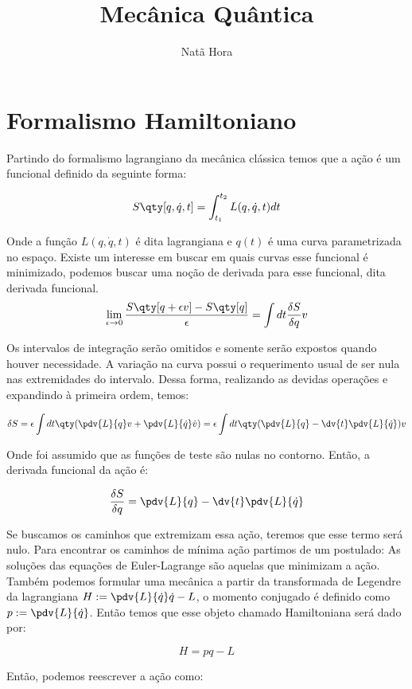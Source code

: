 \documentclass{article}
\title{Mecânica Quântica}
\author{Natã Hora}
\date{}
\begin{document}
	
	\maketitle
	
	\section{Formalismo Hamiltoniano}
	
	Partindo do formalismo lagrangiano da mecânica clássica temos que a ação é um funcional definido da seguinte forma:
	
	$$ S\qty[q,\dot{q},t]= \int_{t_1}^{t_2}L(q,\dot{q},t) dt$$
	
	Onde a função $L(q,\dot{q},t)$ é dita lagrangiana e $q(t)$ é uma curva parametrizada no espaço. Existe um interesse em buscar em quais curvas esse funcional é minimizado, podemos buscar uma noção de derivada para esse funcional, dita derivada funcional.
	$$ \lim_{\epsilon \to 0}\frac{S\qty[q+\epsilon v]-S\qty[q]}{\epsilon}= \int dt \frac{\delta S}{\delta q} v$$
	
	Os intervalos de integração serão omitidos e somente serão expostos quando houver necessidade. A variação na curva possui o requerimento usual de ser nula nas extremidades do intervalo. Dessa forma, realizando as devidas operações e expandindo à primeira ordem, temos:
	
	\begin{equation*}
		\delta S = \epsilon \int dt \qty(\pdv{L}{q}v + \pdv{L}{\dot{q}}\dot{v}) = \epsilon \int dt \qty(\pdv{L}{q}- \dv{t}\pdv{L}{\dot{q}})v
	\end{equation*}
	
	Onde foi assumido que as funções de teste são nulas no contorno. Então, a derivada funcional da ação é:
	
	$$\frac{\delta S}{\delta q}=\pdv{L}{q}- \dv{t}\pdv{L}{\dot{q}}$$
	
	\newpage
	Se buscamos os caminhos que extremizam essa ação, teremos que esse termo será nulo. Para encontrar os caminhos de mínima ação partimos de um postulado: As soluções das equações de Euler-Lagrange são aquelas que minimizam a ação. Também podemos formular uma mecânica a partir da transformada de Legendre da lagrangiana $H:= \pdv{L}{\dot{q}} \dot{q} - L$, o momento conjugado é definido como $p:= \pdv{L}{\dot{q}}$. Então temos que esse objeto chamado Hamiltoniana será dado por:
	
	$$H= pq -L$$
	
	Então, podemos reescrever a ação como:
	
\end{document}
